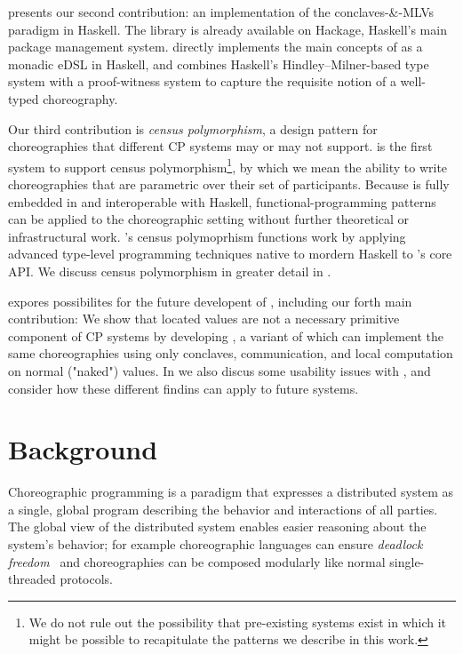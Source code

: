  presents our second contribution: an implementation of the conclaves-\&-MLVs paradigm in Haskell.
The \MultiChor library is already available on Hackage, Haskell's main package management system.
\MultiChor directly implements the main concepts of \HLSCentral as a monadic eDSL in Haskell,
and combines Haskell's Hindley–Milner-based type system with a proof-witness system
to capture the requisite notion of a well-typed choreography.

Our third contribution is \emph{census polymorphism},
a design pattern for choreographies that different CP systems may or may not support.
\MultiChor is the first system to support census polymorphism\footnote{
	We do not rule out the possibility that pre-existing systems exist
	in which it might be possible to recapitulate the patterns we describe in this work.
},
by which we mean the ability to write choreographies
that are parametric over their set of participants.
Because \MultiChor is fully embedded in and interoperable with Haskell,
functional-programming patterns can be applied to the choreographic setting without further theoretical or infrastructural work.
\MultiChor's census polymoprhism functions work by applying advanced type-level programming techniques native to mordern Haskell
to \MultiChor's core API.
We discuss census polymorphism in greater detail in .

 expores possibilites for the future developent of \MultiChor,
including our forth main contribution:
We show that located values are not a necessary primitive component of CP systems
by developing \minichor,
a variant of \MultiChor which can implement the same choreographies using only conclaves, communication, and local computation on normal ("naked") values.
In  we also discus some usability issues with \MultiChor,
and consider how these different findins can apply to future systems.



\section{Background}
\label{sec:background}

Choreographic programming is a paradigm that expresses a distributed system
as a single, global program describing the behavior and interactions of all parties.
The global view of the distributed system enables easier reasoning about the system's behavior;
for example choreographic languages can ensure \emph{deadlock freedom}~\cite{montesi-carbone-dfbd}
and choreographies can be composed modularly like normal single-threaded protocols.

